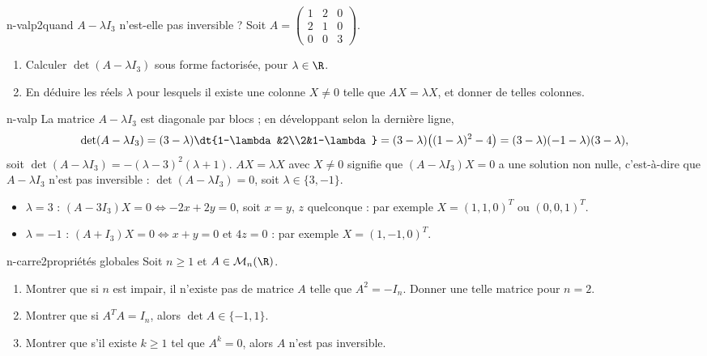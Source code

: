 \begin{exo}{n-valp}{2}{quand $A-\lambda I_3$ n'est-elle pas inversible ?}
Soit $A=\begin{pmatrix}1&2&0\\2&1&0\\0&0&3\end{pmatrix}$.
\begin{enumerate}
\item Calculer $\det(A-\lambda I_3)$ sous forme factorisée, pour $\lambda\in\R$.
\item En déduire les réels $\lambda$ pour lesquels il existe une colonne $X\neq0$ telle que $AX=\lambda X$, et donner de telles colonnes.
\end{enumerate}
\end{exo}

\begin{corrige}{n-valp}
 La matrice $A-\lambda I_3$ est diagonale par blocs ; en développant selon la dernière ligne,
\[\det(A-\lambda I_3)=(3-\lambda)\dt{1-\lambda&2\\2&1-\lambda}=(3-\lambda)\big((1-\lambda)^2-4\big)=(3-\lambda)(-1-\lambda)(3-\lambda),\]
soit $\det(A-\lambda I_3)=-(\lambda-3)^2(\lambda+1)$.
 $AX=\lambda X$ avec $X\neq0$ signifie que $(A-\lambda I_3)X=0$ a une solution non nulle, c'est-à-dire que $A-\lambda I_3$ n'est pas inversible : $\det(A-\lambda I_3)=0$, soit $\lambda\in\{3,-1\}$.
\begin{itemize}
\item $\lambda=3$ : $(A-3I_3)X=0\iff-2x+2y=0$, soit $x=y$, $z$ quelconque : par exemple $X=(1,1,0)^T$ ou $(0,0,1)^T$.
\item $\lambda=-1$ : $(A+I_3)X=0\iff x+y=0$ et $4z=0$ : par exemple $X=(1,-1,0)^T$.
\end{itemize}
\end{corrige}

\begin{exo}{n-carre}{2}{propriétés globales}
Soit $n\geq1$ et $A\in\mathcal M_n(\R)$.
\begin{enumerate}
\item Montrer que si $n$ est impair, il n'existe pas de matrice $A$ telle que $A^2=-I_n$. Donner une telle matrice pour $n=2$.
\item Montrer que si $A^TA=I_n$, alors $\det A\in\{-1,1\}$.
\item Montrer que s'il existe $k\geq1$ tel que $A^k=0$, alors $A$ n'est pas inversible.
\end{enumerate}
\end{exo}

